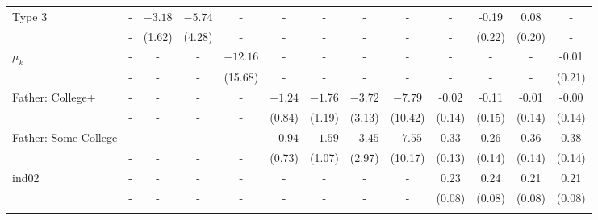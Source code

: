 \begin{tabular}{lcccccccccccc}
Type 3&-&$-3.18$&$-5.74$&-&-&-&-&-&-&-0.19&0.08&-\\
&-&(1.62)&(4.28)&-&-&-&-&-&-&(0.22)&(0.20)&-\\
$\mu_{k}$&-&-&-&$-12.16$&-&-&-&-&-&-&-&-0.01\\
&-&-&-&(15.68)&-&-&-&-&-&-&-&(0.21)\\
Father: College+&-&-&-&-&$-1.24$&$-1.76$&$-3.72$&$-7.79$&-0.02&-0.11&-0.01&-0.00\\
&-&-&-&-&(0.84)&(1.19)&(3.13)&(10.42)&(0.14)&(0.15)&(0.14)&(0.14)\\
Father: Some College&-&-&-&-&$-0.94$&$-1.59$&$-3.45$&$-7.55$&0.33&0.26&0.36&0.38\\
&-&-&-&-&(0.73)&(1.07)&(2.97)&(10.17)&(0.13)&(0.14)&(0.14)&(0.14)\\
ind02&-&-&-&-&-&-&-&-&0.23&0.24&0.21&0.21\\
&-&-&-&-&-&-&-&-&(0.08)&(0.08)&(0.08)&(0.08)\\
\\
\bottomrule\end{tabular}
